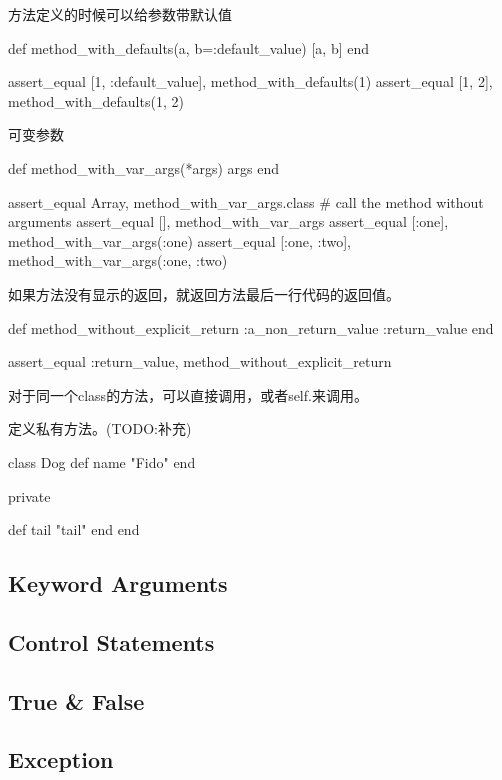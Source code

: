 方法定义的时候可以给参数带默认值
\begin{Ruby}
  	def method_with_defaults(a, b=:default_value)
    	[a, b]
  	end
  
    assert_equal [1, :default_value], method_with_defaults(1)
    assert_equal [1, 2], method_with_defaults(1, 2)
\end{Ruby}

可变参数
\begin{Ruby}
  	def method_with_var_args(*args)
   		args
  	end
  
    assert_equal Array, method_with_var_args.class # call the method without arguments
    assert_equal [], method_with_var_args
    assert_equal [:one], method_with_var_args(:one)
    assert_equal [:one, :two], method_with_var_args(:one, :two)
\end{Ruby}

如果方法没有显示的返回，就返回方法最后一行代码的返回值。
\begin{Ruby}
  	def method_without_explicit_return
    	:a_non_return_value
    	:return_value
  	end
  	
  	assert_equal :return_value, method_without_explicit_return
\end{Ruby}


对于同一个class的方法，可以直接调用，或者self.来调用。

定义私有方法。(TODO:补充)
\begin{Ruby}
  class Dog
    def name
      "Fido"
    end

    private

    def tail
      "tail"
    end
  end
\end{Ruby}

\subsection{Keyword Arguments}

\subsection{Control Statements}

\subsection{True \& False}

\subsection{Exception}


